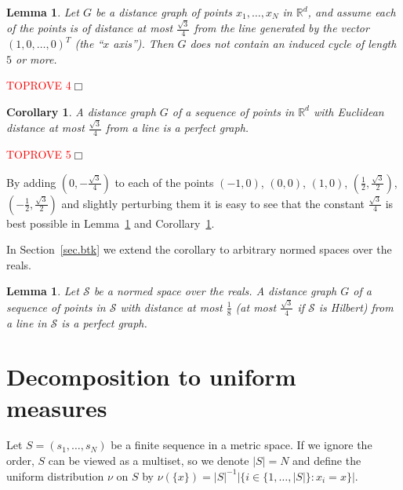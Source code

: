 \documentclass{article}
\newenvironment{proof}{\noindent{\bf Proof}}{\hspace*{\fill}$\Box$}
\newtheorem{lemma} [theorem] {Lemma}\newtheorem{attempt} [theorem] {Attempt}\newtheorem{corollary} [theorem] {Corollary}\newtheorem{prop} [theorem] {Proposition}\newtheorem{definition} [theorem] {Definition}\newtheorem{remark} [theorem] {Remark}\newtheorem{conjecture} [theorem] {Conjecture}\newtheorem{claim} [theorem] {Claim}
\begin{document}
\begin{lemma}\label{lem.C5}
    Let $G$ be a distance graph of points $x_1, \dots, x_N$ in $\mathbb{R}^d$,
    and assume each of the points is of distance at most $\frac {\sqrt 3} 4$
    from the line generated by the vector $(1, 0, \dots,0)^T$ (the ``$x$ axis''). 
    Then $G$ does not contain
    an induced cycle of length $5$ or more.
\end{lemma}
\begin{proof}\textcolor{red}{TOPROVE 4}\end{proof}

\begin{corollary}\label{cor.perfect}
    A distance graph $G$ of a sequence of points in $\mathbb{R}^d$ with Euclidean distance at most $\frac {\sqrt 3} 4$
    from a line is a perfect graph.
\end{corollary}
\begin{proof}\textcolor{red}{TOPROVE 5}\end{proof}

\medskip

By adding $(0, -\frac{\sqrt 3} 4)$ to each of the points $(-1, 0)$, $(0,0)$, $(1,0)$, $(\frac 1 2, \frac {\sqrt 3} 2)$, $(-\frac 1 2, \frac {\sqrt 3} 2)$ and slightly perturbing them it is easy to see that the constant $\frac {\sqrt 3} 4$ is best possible in Lemma~\ref{lem.C5} and Corollary~\ref{cor.perfect}.

In Section~\ref{sec.btk} we extend the corollary to arbitrary normed spaces over the reals. 

\begin{lemma}\label{lem.perfect_gen}
    Let $\mathcal{S}$ be a normed space over the reals. A distance graph $G$ of a sequence of points in $\mathcal{S}$ with distance at most $\frac 1 8$ (at most $\frac {\sqrt 3} 4$ if $\mathcal{S}$ is Hilbert)
    from a line in $\mathcal{S}$ is a perfect graph.
\end{lemma}

\section{Decomposition to uniform measures}
\label{sec.decomposition}

Let $S = (s_1, \dots, s_N)$ be a finite sequence in a metric space. If we ignore the order, $S$ can be viewed as a multiset, so we denote $|S|=N$
and define the uniform distribution $\nu$ on $S$ by $\nu(\{x\}) = |S|^{-1} |\{i \in \{1,\dots,|S|\}: x_i = x\}|$.
\end{document}
